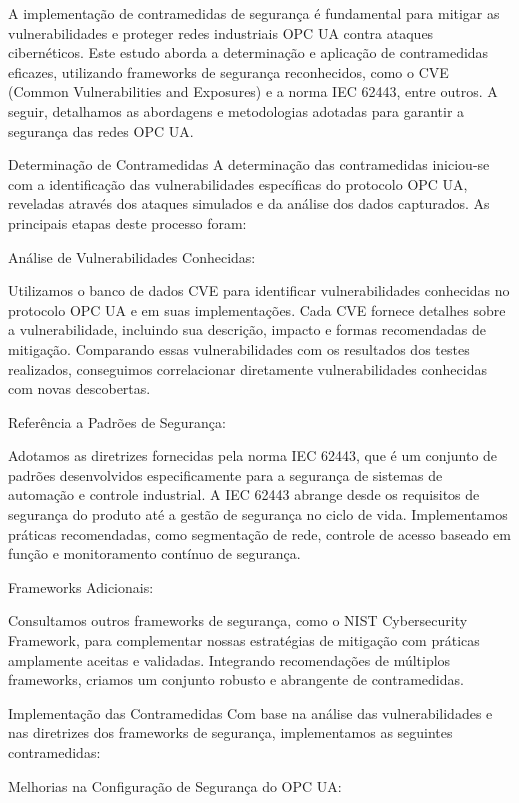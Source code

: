     {\color{red}
    A implementação de contramedidas de segurança é fundamental para mitigar as vulnerabilidades e proteger redes industriais OPC UA contra ataques cibernéticos. Este estudo aborda a determinação e aplicação de contramedidas eficazes, utilizando frameworks de segurança reconhecidos, como o CVE (Common Vulnerabilities and Exposures) e a norma IEC 62443, entre outros. A seguir, detalhamos as abordagens e metodologias adotadas para garantir a segurança das redes OPC UA.

    Determinação de Contramedidas
    A determinação das contramedidas iniciou-se com a identificação das vulnerabilidades específicas do protocolo OPC UA, reveladas através dos ataques simulados e da análise dos dados capturados. As principais etapas deste processo foram:

    Análise de Vulnerabilidades Conhecidas:

    Utilizamos o banco de dados CVE para identificar vulnerabilidades conhecidas no protocolo OPC UA e em suas implementações. Cada CVE fornece detalhes sobre a vulnerabilidade, incluindo sua descrição, impacto e formas recomendadas de mitigação. Comparando essas vulnerabilidades com os resultados dos testes realizados, conseguimos correlacionar diretamente vulnerabilidades conhecidas com novas descobertas.

    Referência a Padrões de Segurança:

    Adotamos as diretrizes fornecidas pela norma IEC 62443, que é um conjunto de padrões desenvolvidos especificamente para a segurança de sistemas de automação e controle industrial. A IEC 62443 abrange desde os requisitos de segurança do produto até a gestão de segurança no ciclo de vida. Implementamos práticas recomendadas, como segmentação de rede, controle de acesso baseado em função e monitoramento contínuo de segurança.

    Frameworks Adicionais:

    Consultamos outros frameworks de segurança, como o NIST Cybersecurity Framework, para complementar nossas estratégias de mitigação com práticas amplamente aceitas e validadas. Integrando recomendações de múltiplos frameworks, criamos um conjunto robusto e abrangente de contramedidas.

    Implementação das Contramedidas
    Com base na análise das vulnerabilidades e nas diretrizes dos frameworks de segurança, implementamos as seguintes contramedidas:

    Melhorias na Configuração de Segurança do OPC UA:

}
